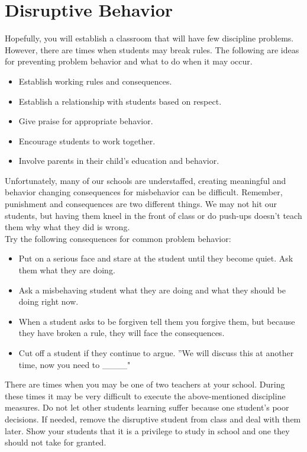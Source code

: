 \section{Disruptive Behavior}
Hopefully, you will establish a classroom that will have few discipline problems.  However, there are times when students may break rules.  The following are ideas for preventing problem behavior and what to do when it may occur.

\begin{itemize}
 \item Establish working rules and consequences.
 \item Establish a relationship with students based on respect.
 \item Give praise for appropriate behavior.
 \item Encourage students to work together.
 \item Involve parents in their child's education and behavior.
\end{itemize}

Unfortunately, many of our schools are understaffed, creating meaningful and behavior changing consequences for misbehavior can be difficult.  Remember, punishment and consequences are two different things.  We may not hit our students, but having them kneel in the front of class or do push-ups doesn't teach them why what they did is wrong.\\  

Try the following consequences for common problem behavior:
\begin{itemize}
 \item Put on a serious face and stare at the student until they become quiet. Ask them what they are doing.
 \item Ask a misbehaving student what they are doing and what they should be doing right now.
 \item When a student asks to be forgiven tell them you forgive them, but because they have broken a rule, they will face the consequences.
 \item Cut off a student if they continue to argue. ''We will discuss this at another time, now you need to \_\_\_\_"
\end{itemize}

There are times when you may be one of two teachers at your school.  During these times it may be very difficult to execute the above-mentioned discipline measures.  Do not let other students learning suffer because one student's poor decisions.  If needed, remove the disruptive student from class and deal with them later.  Show your students that it is a privilege to study in school and one they should not take for granted.


